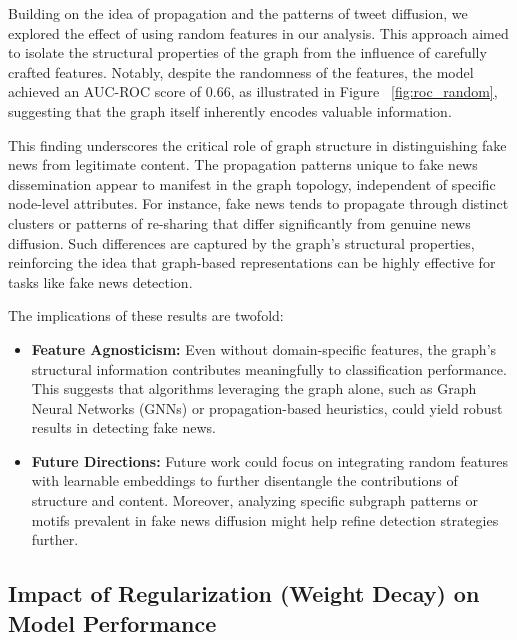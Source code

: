 \documentclass[sigconf,nonacm]{acmart}
\begin{document}
Building on the idea of propagation and the patterns of tweet diffusion, we explored the effect of using random features in our analysis. This approach aimed to isolate the structural properties of the graph from the influence of carefully crafted features. Notably, despite the randomness of the features, the model achieved an AUC-ROC score of 0.66, as illustrated in Figure  ~\ref{fig:roc_random}, suggesting that the graph itself inherently encodes valuable information.

This finding underscores the critical role of graph structure in distinguishing fake news from legitimate content. The propagation patterns unique to fake news dissemination appear to manifest in the graph topology, independent of specific node-level attributes. For instance, fake news tends to propagate through distinct clusters or patterns of re-sharing that differ significantly from genuine news diffusion. Such differences are captured by the graph's structural properties, reinforcing the idea that graph-based representations can be highly effective for tasks like fake news detection.

The implications of these results are twofold:
\begin{itemize}
    \item \textbf{Feature Agnosticism:} Even without domain-specific features, the graph's structural information contributes meaningfully to classification performance. This suggests that algorithms leveraging the graph alone, such as Graph Neural Networks (GNNs) or propagation-based heuristics, could yield robust results in detecting fake news.
    \item \textbf{Future Directions:} Future work could focus on integrating random features with learnable embeddings to further disentangle the contributions of structure and content. Moreover, analyzing specific subgraph patterns or motifs prevalent in fake news diffusion might help refine detection strategies further.
\end{itemize}

\subsection{Impact of Regularization (Weight Decay) on Model Performance}
\end{document}
